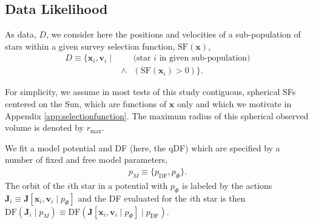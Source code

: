 \documentclass[iop,revtex4,numberedappendix,appendixfloats]{emulateapj}
\newcommand{\vect}[1]{\boldsymbol{#1}}
\newcommand{\pmodel}{\ensuremath{p_M}}
\begin{document}

\subsection{Data Likelihood} \label{sec:data_likelihood}

As data, $D$, we consider here the positions and velocities of a sub-population of stars within a given survey selection function, $\text{SF}(\vect{x})$,
\begin{eqnarray*}
D \equiv \{ \vect{x}_i,\vect{v}_i \mid && \text{(star $i$ in given sub-population)}\nonumber\\
&\wedge& (\text{SF}(\vect{x}_i) > 0) \}.
\end{eqnarray*}

For simplicity, we assume in most tests of this study contiguous, spherical SFs centered on the Sun, which are functions of $\vect{x}$ only and which we motivate in Appendix \ref{app:selectionfunction}. The maximum radius of this spherical observed volume is denoted by $r_\text{max}$.

We fit a model potential and DF (here, the qDF) which are specified by a number of fixed and free model parameters,
\begin{eqnarray*}
\pmodel \equiv \{ p_\text{DF} , p_\Phi \}.
\end{eqnarray*}
The orbit of the $i$th star in a potential with $p_\Phi$ is labeled by the actions $\vect{J}_i \equiv \vect{J}[\vect{x}_i,\vect{v}_i\mid p_{\Phi}]$ and the DF evaluated for the $i$th star is then $\text{DF}(\vect{J}_i \mid \pmodel) \equiv \text{DF}(\vect{J}[\vect{x}_i,\vect{v}_i\mid p_{\Phi}] \mid p_\text{DF})$.
\end{document}

